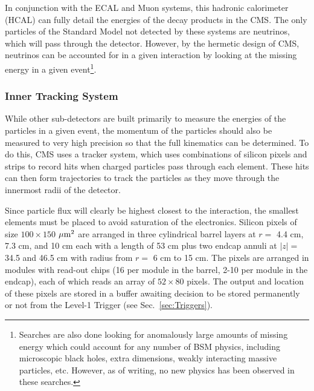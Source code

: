 In conjunction with the ECAL and Muon systems, this hadronic calorimeter (HCAL) can fully detail the energies of the decay products in the CMS. The only particles of the Standard Model not detected by these systems are neutrinos, which will pass through the detector. However, by the hermetic design of CMS, neutrinos can be accounted for in a given interaction by looking at the missing energy in a given event\footnote{Searches are also done looking for anomalously large amounts of missing energy which could account for any number of BSM physics, including microscopic black holes, extra dimensions, weakly interacting massive particles, etc. However, as of writing, no new physics has been observed in these searches.}. 

\subsubsection{Inner Tracking System}
\label{sec:Tracker}

While other sub-detectors are built primarily to measure the energies of the particles in a given event, the momentum of the particles should also be measured to very high precision so that the full kinematics can be determined. To do this, CMS uses a tracker system, which uses combinations of silicon pixels and strips to record hits when charged particles pass through each element. These hits can then form trajectories to track the particles as they move through the innermost radii of the detector. 

Since particle flux will clearly be highest closest to the interaction, the smallest elements must be placed to avoid saturation of the electronics. Silicon pixels of size $100\times150$ $\mu\rm{m}^2$ are arranged in three cylindrical barrel layers at $r=$ 4.4 cm, 7.3 cm, and 10 cm each with a length of 53 cm plus two endcap annuli at $|z|=$ 34.5 and 46.5 cm with radius from $r=$ 6 cm to 15 cm. The pixels are arranged in modules with read-out chips (16 per module in the barrel, 2-10 per module in the endcap), each of which reads an array of $52\times80$ pixels. The output and location of these pixels are stored in a buffer awaiting decision to be stored permanently or not from the Level-1 Trigger (see Sec.~\ref{sec:Triggers}).

